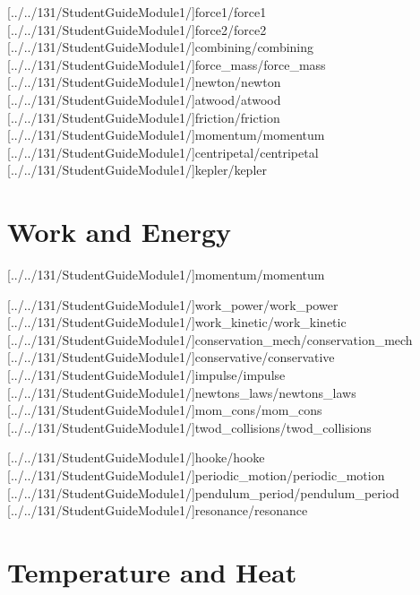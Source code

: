 \documentclass[english,twoside]{article}
\begin{document}
[../../131/StudentGuideModule1/]{force1/force1} %
[../../131/StudentGuideModule1/]{force2/force2}
[../../131/StudentGuideModule1/]{combining/combining}
[../../131/StudentGuideModule1/]{force_mass/force_mass}
[../../131/StudentGuideModule1/]{newton/newton}
[../../131/StudentGuideModule1/]{atwood/atwood}
[../../131/StudentGuideModule1/]{friction/friction}
[../../131/StudentGuideModule1/]{momentum/momentum} %
[../../131/StudentGuideModule1/]{centripetal/centripetal}
[../../131/StudentGuideModule1/]{kepler/kepler}

\part{Work and Energy}

[../../131/StudentGuideModule1/]{momentum/momentum} %

[../../131/StudentGuideModule1/]{work_power/work_power} %
[../../131/StudentGuideModule1/]{work_kinetic/work_kinetic} %
[../../131/StudentGuideModule1/]{conservation_mech/conservation_mech}
[../../131/StudentGuideModule1/]{conservative/conservative} %
[../../131/StudentGuideModule1/]{impulse/impulse} %
[../../131/StudentGuideModule1/]{newtons_laws/newtons_laws} %
[../../131/StudentGuideModule1/]{mom_cons/mom_cons}
[../../131/StudentGuideModule1/]{twod_collisions/twod_collisions}


[../../131/StudentGuideModule1/]{hooke/hooke}
[../../131/StudentGuideModule1/]{periodic_motion/periodic_motion}
[../../131/StudentGuideModule1/]{pendulum_period/pendulum_period}
[../../131/StudentGuideModule1/]{resonance/resonance}

\part{Temperature and Heat}
\end{document}
